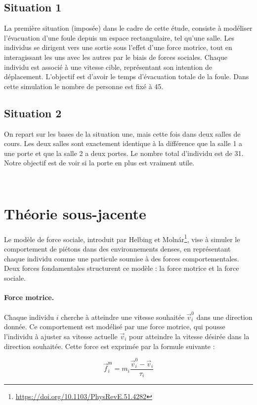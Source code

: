 \documentclass[a4paper,12pt]{article}
\begin{document}
\subsection{Situation 1}
\indent La première situation (imposée) dans le cadre de cette étude, consiste à modéliser l’évacuation d’une foule depuis un espace rectangulaire, tel qu’une salle. Les individus se dirigent vers une sortie sous l'effet d'une force motrice, tout en interagissant les uns avec les autres par le biais de forces sociales. Chaque individu est associé à une vitesse cible, représentant son intention de déplacement. L'objectif est d'avoir le temps d'évacuation totale de la foule. Dans cette simulation le nombre de personne est fixé à 45.

\subsection{Situation 2}
\indent On repart sur les bases de la situation une, mais cette fois dans deux salles de cours. Les deux salles sont exactement identique à la différence que la salle 1 a une porte et que la salle 2 a deux portes. Le nombre total d'individu est de 31. Notre objectif est de voir si la porte en plus est vraiment utile.

\
\section{Théorie sous-jacente}

Le modèle de force sociale, introduit par Helbing et Molnár\footnote{\url{https://doi.org/10.1103/PhysRevE.51.4282}}, vise à simuler le comportement de piétons dans des environnements denses, en représentant chaque individu comme une particule soumise à des forces comportementales. Deux forces fondamentales structurent ce modèle : la force motrice et la force sociale.

\paragraph{Force motrice.}
Chaque individu $i$ cherche à atteindre une vitesse souhaitée $\vec{v}_i^0$ dans une direction donnée. Ce comportement est modélisé par une force motrice, qui pousse l'individu à ajuster sa vitesse actuelle $\vec{v}_i$ pour atteindre la vitesse désirée dans la direction souhaitée. Cette force est exprimée par la formule suivante :

\begin{equation}
\label{eq:force_motrice}
\vec{f}_i^{\text{m}} = m_i \frac{\vec{v}_i^0 - \vec{v}_i}{\tau_i}
\end{equation}
\end{document}
